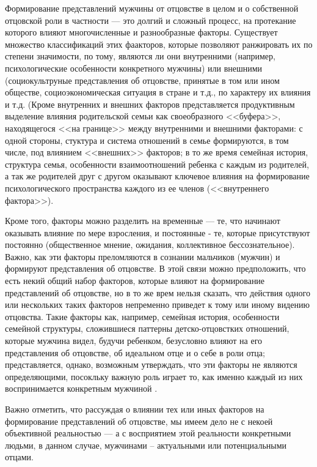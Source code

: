 \documentclass{../../common/thesisbyxetex}
\begin{document}
Формирование представлений мужчины от отцовстве в целом и о собственной отцовской роли в частности
--- это долгий и сложный процесс, на протекание которого влияют многочисленные и разнообразные
факторы. Существует множество классификаций этих фаакторов, которые позволяют ранжировать их по
степени значимости, по тому, являются ли они внутренними (например, психологические особенности
конкретного мужчины) или внешними  (социокультруные представления об отцовстве, принятые в том
или ином обществе, социоэкономическая ситуация в стране и т.д., по характеру их влияния и т.д.
(Кроме внутренних и внешних факторов представляется продуктивным выделение
влияния родительской семьи как своеобразного <<буфера>>, находящегося <<на границе>>
между внутренними и внешними факторами: с одной стороны, стуктура и система отношений в семье
формируются, в том числе, под влиянием <<внешних>> факторов; в то же
время семейная история, структура семья, особенности взаимоотношений ребенка с каждым из
родителей, а так же родителей друг с другом оказывают ключевое влияния на формирование
психологического пространства каждого из ее членов (<<внутреннего фактора>>).

Кроме того, факторы можно разделить на временные --- те, что начинают оказывать влияние по мере
взросления, и постоянные - те, которые присутствуют
постоянно  (общественное мнение, ожидания, коллективное бессознательное). Важно, как эти
факторы преломляются в сознании мальчиков (мужчин) и формируют представления об отцовстве. В этой
связи можно предположить, что есть некий общий набор факторов, которые влияют на формирование
представлений об
отцовстве, но в то же врем нельзя сказать, что действия одного или нескольких таких факторов
непременно приведет к тому или иному видению отцовства. Такие факторы как, например, семейная
история, особенности семейной структуры, сложившиеся паттерны детско-отцовстких отношений,
которые мужчина видел, будучи ребенком, безусловно влияют на его представления об отцовстве, об
идеальном отце и о себе в роли отца; представляется, однако, возможным утверждать, что эти
факторы не являются определяющими, посокльку важную роль играет то, как именно каждый из них
воспринимается конкретным мужчиной \cite[164]{long}.

Важно отметить, что рассуждая о влиянии тех или иных факторов на формирование
представлений об отцовстве, мы имеем дело не с некоей объективной реальностью --- а с восприятием
этой реальности конкретными людьми, в данном случае, мужчинами -- актуальными или потенциальными
отцами.
\end{document}
